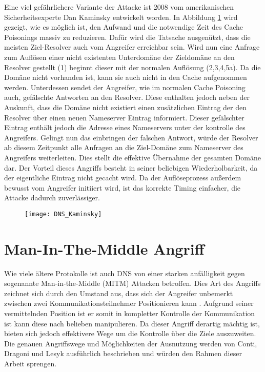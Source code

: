 Eine viel gefährlichere Variante der Attacke ist 2008 vom amerikanischen Sicherheitsexperte Dan Kaminsky entwickelt worden\cite{Son2010}. In Abbildung \ref{img:dnskaminsky} wird gezeigt, wie es möglich ist, den Aufwand und die notwendige Zeit des Cache Poisonings massiv zu reduzieren. Dafür wird die Tatsache ausgenützt, dass die meisten Ziel-Resolver auch vom Angreifer erreichbar sein. Wird nun eine Anfrage zum Auflösen einer nicht existenten Unterdomäne der Zieldomäne an den Resolver gestellt (1) beginnt dieser mit der normalen Auflösung (2,3,4,5a). Da die Domäne nicht vorhanden ist, kann sie auch nicht in den Cache aufgenommen werden. Unterdessen sendet der Angreifer, wie im normalen Cache Poisoning auch, gefälschte Antworten an den Resolver. Diese enthalten jedoch neben der Auskunft, dass die Domäne nicht existiert einen zusätzlichen Eintrag der den Resolver über einen neuen Nameserver Eintrag informiert. Dieser gefälschter Eintrag enthält jedoch die Adresse eines Nameservers unter der kontrolle des Angreifers. Gelingt nun das einbringen der falschen Antwort, würde der Resolver ab diesem Zeitpunkt alle Anfragen an die Ziel-Domäne zum Nameserver des Angreifers weiterleiten. Dies stellt die effektive Übernahme der gesamten Domäne dar.
Der Vorteil dieses Angriffs besteht in seiner beliebigen Wiederholbarkeit, da der eigentliche Eintrag nicht gecacht wird. Da der Auflöseprozess außerdem bewusst vom Angreifer initiiert wird, ist das korrekte Timing einfacher, die Attacke dadurch zuverlässiger.

\begin{figure}[htbp]
    \centering
    \texttt{[image: DNS\_Kaminsky]}
    \caption{}
    \label{img:dnskaminsky}
\end{figure}

\section{Man-In-The-Middle Angriff}

Wie viele ältere Protokolle ist auch DNS von einer starken anfälligkeit gegen sogenannte Man-in-the-Middle (MITM) Attacken betroffen. Dies Art des Angriffs zeichnet sich durch den Umstand aus, dass sich der Angreifer unbemerkt zwischen zwei Kommunikationsteilnehmer Positionieren kann \cite{CAPEC94}. Aufgrund seiner vermittelnden Position ist er somit in kompletter Kontrolle der Kommunikation ist kann diese nach belieben manipulieren. Da dieser Angriff derartig mächtig ist, bieten sich jedoch effektivere Wege um die Kontrolle über die Ziele auszuweiten. Die genauen Angriffswege und Möglichkeiten der Ausnutzung werden von Conti, Dragoni und Lesyk \cite{Conti2016} ausführlich beschrieben und würden den Rahmen dieser Arbeit sprengen.

